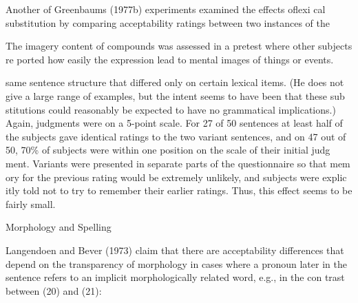 \begin{styleTextbody}
Another of Greenbaum{\textquotesingle}s (1977b) experiments examined the effects oflexi\- cal substitution by comparing acceptability ratings between two instances of the
\end{styleTextbody}


\setcounter{listWWNumxxxiileveli}{5}
\begin{listWWNumxxxiileveli}
\item 
\begin{styleStandard}
The imagery content of compounds was assessed in a pretest where other subjects re\- ported how easily the expression lead to mental images of things or events.
\end{styleStandard}


\end{listWWNumxxxiileveli}
\clearpage\setcounter{page}{1}\begin{styleTextbody}
same sentence structure that differed only on certain lexical items. (He does not give a large range of examples, but the intent seems to have been that these sub\- stitutions could reasonably be expected to have no grammatical implications.) Again, judgments were on a 5-point scale. For 27 of 50 sentences at least half of the subjects gave identical ratings to the two variant sentences, and on 47 out of 50, 70\% of subjects were within one position on the scale of their initial judg\- ment. Variants were presented in separate parts of the questionnaire so that mem\- ory for the previous rating would be extremely unlikely, and subjects were explic\- itly told not to try to remember their earlier ratings. Thus, this effect seems to be fairly small.
\end{styleTextbody}


\begin{styleHeadingviii}
Morphology and Spelling
\end{styleHeadingviii}


\begin{styleTextbody}
Langendoen and Bever (1973) claim that there are acceptability differences that depend on the transparency of morphology in cases where a pronoun later in the sentence refers to an implicit morphologically related word, e.g., in the con\- trast between (20) and (21):
\end{styleTextbody}


